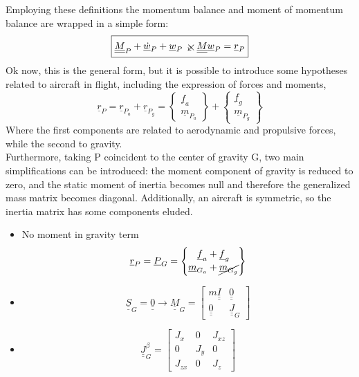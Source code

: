Employing these definitions the momentum balance and moment of momentum balance are wrapped in a simple form:
\begin{equation}
    \label{eq:generalized form of balance equations}\boxed{\underline{\underline{M}}_P+\underline{\dot w}_P+\underline{w}_P\swcross\underline{\underline{M}}\underline{w}_P=\underline{r}_P}
\end{equation}
Ok now, this is the general form, but it is possible to introduce some hypotheses related to aircraft in flight, including the expression of forces and moments, 
\begin{equation}
    \underline{r}_P = \underline{r}_{P_a}+\underline{r}_{P_g}  =
    \begin{Bmatrix}
        \underline{f}_a\\ \underline{m}_{P_a} 
    \end{Bmatrix}
    + \begin{Bmatrix}
        \underline{f}_g \\ \underline{m}_{P_g}  
    \end{Bmatrix}
\end{equation}
Where the first components are related to aerodynamic and propulsive forces, while the second to gravity.
\\
Furthermore, taking P coincident to the center of gravity G, two main simplifications can be introduced: the moment component of gravity is reduced to zero, and the static moment of inertia becomes null and therefore the generalized mass matrix becomes diagonal. Additionally, an aircraft is symmetric, so the inertia matrix has some components eluded.
\begin{itemize}
    \item No moment in gravity term
    \begin{equation}
        \underline{r}_P = \underline{P}_G = \begin{Bmatrix}
            \underline{f}_a+\underline{f}_g\\
            \underline{m}_{G_a} + \cancel{\underline{m}_{G_g}}
        \end{Bmatrix} 
    \end{equation}
    \item 
    \begin{equation}
        \underline{\underline{S}}_G = \underline{\underline{0}} \rightarrow \underline{\underline{M}}_G = \begin{bmatrix}
            m\underline{\underline{I}} & \underline{\underline{0}}\\
            \underline{\underline{0}} & \underline{\underline{J}}_G
        \end{bmatrix}
    \end{equation}
    \item 
    \begin{equation}
        \underline{\underline{J}}_G^\beta = \begin{bmatrix}
            J_x & 0 & J_{xz}\\
            0 & J_y & 0\\
            J_{zx} & 0 & J_z
        \end{bmatrix}
    \end{equation}
\end{itemize}
